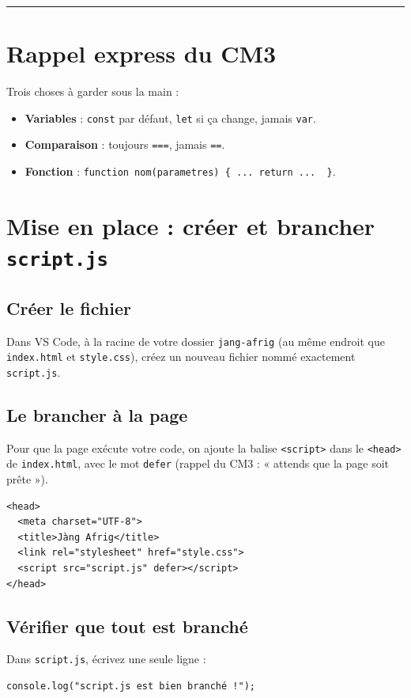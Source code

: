 \documentclass[11pt,a4paper]{article}
\newcommand{\code}[1]{\texttt{#1}}
\begin{document}
\tableofcontents
\bigskip\hrule\bigskip

\section*{Rappel express du CM3}
Trois choses à garder sous la main :
\begin{itemize}[leftmargin=*,noitemsep]
  \item \textbf{Variables} : \code{const} par défaut, \code{let} si ça change, jamais \code{var}.
  \item \textbf{Comparaison} : toujours \code{===}, jamais \code{==}.
  \item \textbf{Fonction} : \code{function nom(parametres) \{ ... return ...\, \}}.
\end{itemize}

\section{Mise en place : créer et brancher \texttt{script.js}}

\subsection{Créer le fichier}
Dans VS Code, à la racine de votre dossier \code{jang-afrig} (au même endroit que \code{index.html} et \code{style.css}), créez un nouveau fichier nommé exactement \code{script.js}.

\subsection{Le brancher à la page}
Pour que la page exécute votre code, on ajoute la balise \code{<script>} dans le \code{<head>} de \code{index.html}, avec le mot \code{defer} (rappel du CM3 : « attends que la page soit prête »).

\begin{lstlisting}[style=html]
<head>
  <meta charset="UTF-8">
  <title>Jàng Afrig</title>
  <link rel="stylesheet" href="style.css">
  <script src="script.js" defer></script>
</head>
\end{lstlisting}

\subsection{Vérifier que tout est branché}
Dans \code{script.js}, écrivez une seule ligne :
\begin{lstlisting}[style=js]
console.log("script.js est bien branché !");
\end{lstlisting}
\end{document}

